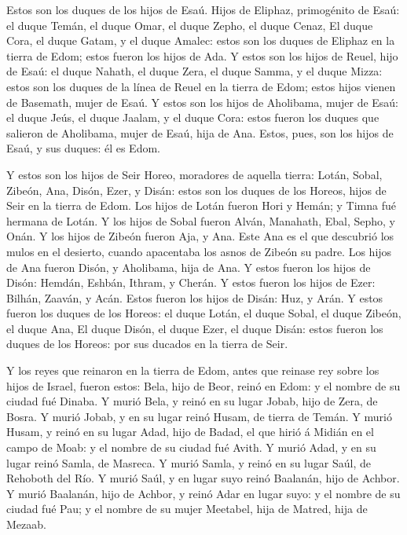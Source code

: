  Estos son los duques de los hijos de Esaú. Hijos de
Eliphaz, primogénito de Esaú: el duque Temán, el duque Omar, el duque
Zepho, el duque Cenaz,  El duque Cora, el duque Gatam, y el
duque Amalec: estos son los duques de Eliphaz en la tierra de Edom;
estos fueron los hijos de Ada.  Y estos son los hijos de
Reuel, hijo de Esaú: el duque Nahath, el duque Zera, el duque Samma, y
el duque Mizza: estos son los duques de la línea de Reuel en la tierra
de Edom; estos hijos vienen de Basemath, mujer de Esaú.  Y
estos son los hijos de Aholibama, mujer de Esaú: el duque Jeús, el duque
Jaalam, y el duque Cora: estos fueron los duques que salieron de
Aholibama, mujer de Esaú, hija de Ana.  Estos, pues, son
los hijos de Esaú, y sus duques: él es Edom.

 Y estos son los hijos de Seir Horeo, moradores de aquella
tierra: Lotán, Sobal, Zibeón, Ana,  Disón, Ezer, y Disán:
estos son los duques de los Horeos, hijos de Seir en la tierra de Edom.
 Los hijos de Lotán fueron Hori y Hemán; y Timna fué
hermana de Lotán.  Y los hijos de Sobal fueron Alván,
Manahath, Ebal, Sepho, y Onán.  Y los hijos de Zibeón
fueron Aja, y Ana. Este Ana es el que descubrió los mulos en el
desierto, cuando apacentaba los asnos de Zibeón su padre. 
Los hijos de Ana fueron Disón, y Aholibama, hija de Ana.  Y
estos fueron los hijos de Disón: Hemdán, Eshbán, Ithram, y Cherán.
 Y estos fueron los hijos de Ezer: Bilhán, Zaaván, y Acán.
 Estos fueron los hijos de Disán: Huz, y Arán.
 Y estos fueron los duques de los Horeos: el duque Lotán,
el duque Sobal, el duque Zibeón, el duque Ana,  El duque
Disón, el duque Ezer, el duque Disán: estos fueron los duques de los
Horeos: por sus ducados en la tierra de Seir.

 Y los reyes que reinaron en la tierra de Edom, antes que
reinase rey sobre los hijos de Israel, fueron estos:  Bela,
hijo de Beor, reinó en Edom: y el nombre de su ciudad fué Dinaba.
 Y murió Bela, y reinó en su lugar Jobab, hijo de Zera, de
Bosra.  Y murió Jobab, y en su lugar reinó Husam, de tierra
de Temán.  Y murió Husam, y reinó en su lugar Adad, hijo de
Badad, el que hirió á Midián en el campo de Moab: y el nombre de su
ciudad fué Avith.  Y murió Adad, y en su lugar reinó Samla,
de Masreca.  Y murió Samla, y reinó en su lugar Saúl, de
Rehoboth del Río.  Y murió Saúl, y en lugar suyo reinó
Baalanán, hijo de Achbor.  Y murió Baalanán, hijo de
Achbor, y reinó Adar en lugar suyo: y el nombre de su ciudad fué Pau; y
el nombre de su mujer Meetabel, hija de Matred, hija de Mezaab.

